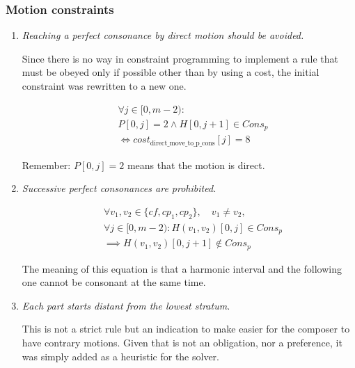 \subsubsection{Motion constraints}
\begin{enumerate}[wide, label=\bfseries 1.P\arabic*]
    \item\label{constraint:direct-to-p-cons} \reddot \textit{Reaching a perfect consonance by direct motion should be avoided.}

    Since there is no way in constraint programming to implement a rule that must be obeyed only if possible other than by using a cost, the initial constraint was rewritten to a new one.

    \begin{equation} \begin{aligned}
    &\forall j \in [0, m-2) :\\
    &P[0, j] = 2 \land H[0, j+1] \in Cons_{p} \\
    &\iff cost_{\text{{direct\_move\_to\_p\_cons}}}[j] = 8
    \end{aligned} \end{equation}

    Remember: $P[0,j] = 2$ means that the motion is direct.
    
\setcounter{enumi}{3} %
    \item\label{constraint:succ-p-cons} \reddot  \textit{Successive perfect consonances are prohibited.}

    \begin{equation} \begin{aligned}
    &\forall v_1, v_2 \in \{cf, cp_1, cp_2\}, \quad v_1 \neq v_2, \quad \\
    &\forall j \in [0, m-2) \colon H(v_1,v_2)[0, j] \in Cons_p \\
    &\implies H(v_1,v_2)[0, j+1] \notin Cons_p
    \end{aligned} \end{equation}

    The meaning of this equation is that a harmonic interval and the following one cannot be consonant at the same time.
    
    \item\label{constraint:start-distant} \reddot \textit{Each part starts distant from the lowest stratum.}

    This is not a strict rule but an indication to make easier for the composer to have contrary motions. Given that is not an obligation, nor a preference, it was simply added as a heuristic for the solver.


\end{enumerate}
